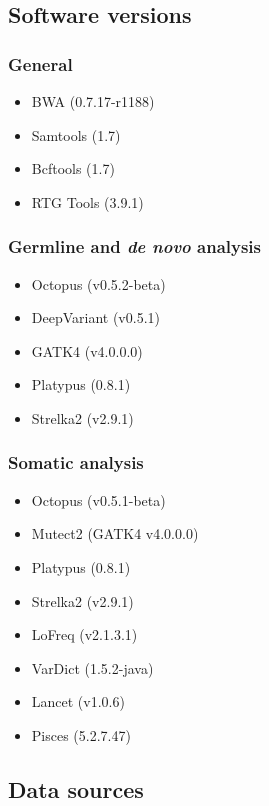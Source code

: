 \documentclass{article}
\begin{document}
\subsection*{Software versions}

\subsubsection*{General}

\begin{itemize}
    \item BWA (0.7.17-r1188)
    \item Samtools (1.7)
    \item Bcftools (1.7)
    \item RTG Tools (3.9.1)
\end{itemize}

\subsubsection*{Germline and \textit{de novo} analysis}

\begin{itemize}
    \item Octopus (v0.5.2-beta)
    \item DeepVariant (v0.5.1)
    \item GATK4 (v4.0.0.0)
    \item Platypus (0.8.1)
    \item Strelka2 (v2.9.1)
\end{itemize}

\subsubsection*{Somatic analysis}

\begin{itemize}
    \item Octopus (v0.5.1-beta)
    \item Mutect2 (GATK4 v4.0.0.0)
    \item Platypus (0.8.1)
    \item Strelka2 (v2.9.1)
    \item LoFreq (v2.1.3.1)
    \item VarDict (1.5.2-java)
    \item Lancet (v1.0.6)
    \item Pisces (5.2.7.47)
\end{itemize}

\subsection*{Data sources}
\end{document}
